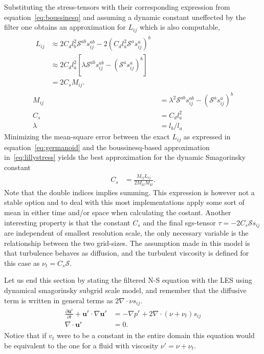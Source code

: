 Substituting the stress-tensors with their corresponding expression 
from equation~\ref{eq:boussinesq} and assuming a dynamic constant uneffected by the filter 
one obtains an approximation for $L_{ij}$ which is also computable,
\begin{align}
    \begin{split}
L_{ij} &\approx 2C_d l_b^2 \mathcal{S}^{ab} s^{ab}_{ij}
        -2 (C_d l_a^2 \mathcal{S}^a s^a_{ij})^b\\
        &\approx 2C_dl_a^2[\lambda\mathcal{S}^{ab}s^{ab}_{ij} 
        - (\mathcal{S}^{a}s^{a}_{ij})^b]\\
        &= 2C_s M_{ij}.
        \label{eq:lillystress}
    \end{split} \\
    M_{ij} &= \lambda^{2}\mathcal{S}^{ab}s_{ij}^{ab} - (\mathcal{S}^as_{ij}^a)^b\\
        C_s &= C_dl_a^2\\
        \lambda &= l_b/l_a
    \label{eq:dynsmagderivation}
\end{align}
Minimizing the mean-square error between the exact $L_{ij}$ as expressed in 
equation~\ref{eq:germanoid} and the boussinesq-based approximation 
in~\ref{eq:lillystress} yields the best approximation 
for the dynamic Smagorinsky constant 
%
\begin{align}
    C_s &= \frac{M_{ij}L_{ij}}{2M_{kl}M_{kl}}.
    \label{eq:dynsmag}
\end{align}
%
Note that the double indices implies summing. This expression is however not a 
stable option and to deal with this most implementations apply some sort of mean 
in either time and/or space when calculating the costant. Another interesting property 
is that the constant $C_s$ and the final sgs-tensor $\tau = -2C_s\mathcal{S}s_{ij}$ are 
independent of smallest resolution scale, the only necessary variable is the relationship 
between the two grid-sizes. The assumption made in this model is that turbulence behaves 
as diffusion, and the turbulent viscosity is defined for this case as $\nu_t = C_s\mathcal{S}$.

Let us end this section by stating the filtered N-S equation with the LES using 
dynamical smagorinsky subgrid scale model, and remember that the diffusive term is written 
in general terms as $2\nabla \cdot \nu s_{ij}$.  
%
\begin{align}
    \begin{split}
        \frac{\partial \mathbf{u}^r}{\partial t} + \mathbf{u}^r\cdot \nabla\mathbf{u}^r
        &= -\nabla p^r +2\nabla \cdot (\nu + \nu_t) s_{ij} \\
        \nabla \cdot \mathbf{u}^r &= 0.
    \end{split}
	\label{eq:NSLES}
\end{align}
%
Notice that if $v_t$ were to be a constant in the entire domain this equation would 
be equivalent to the one for a fluid with viscosity $\nu'= \nu + \nu_t$.


